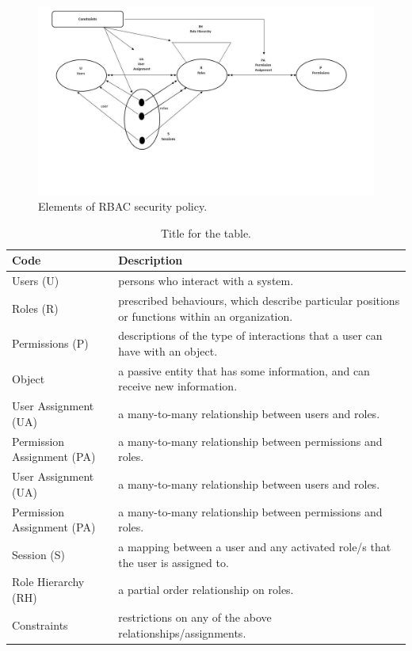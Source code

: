\begin{figure}[bht]
\centering
\includegraphics[scale=0.4]{RBACElements.jpg}
\caption{Elements of RBAC security policy.}
\label{fig:elelmRBAC}
\end{figure}


\begin{table}[bth]
\centering
\caption{Title for the table.}
\small
{}
\begin{tabular}{p{1.6 in} p{5.2 in}} \hline 
\hline
Code & Description\\\hline

Users (U)&  persons who interact with a system.\\
Roles (R)& prescribed behaviours, which describe particular positions or functions within an organization. \\
Permissions (P)& descriptions of the type of interactions that a user can have with an object.\\
Object& a passive entity that has some information, and   can receive new information.\\
User Assignment (UA)& a many-to-many relationship   between users and roles.\\
Permission Assignment (PA)& a many-to-many relationship between permissions and roles.\\
User Assignment (UA)&a many-to-many relationship between users and roles.\\
 Permission Assignment (PA)& a many-to-many relationship between permissions and roles.\\
Session (S)& a mapping between a user and any activated role/s that the user is assigned to.\\
Role Hierarchy (RH)& a partial order relationship on roles.\\
Constraints&restrictions on any of the above relationships/assignments.  \\ \hline\hline

\end{tabular}
\label{tab:namehere}


\end{table}
